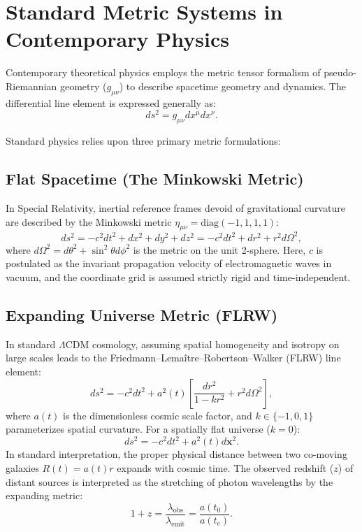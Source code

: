 \section{Standard Metric Systems in Contemporary Physics}
\label{sec:standart_metrik}

Contemporary theoretical physics employs the metric tensor formalism of pseudo-Riemannian geometry ($g_{\mu\nu}$) to describe spacetime geometry and dynamics. The differential line element is expressed generally as:
\begin{equation}
    ds^2 = g_{\mu\nu} dx^\mu dx^\nu.
    \label{eq:genel_cizgi_elemani}
\end{equation}

Standard physics relies upon three primary metric formulations:

\subsection{Flat Spacetime (The Minkowski Metric)}
In Special Relativity, inertial reference frames devoid of gravitational curvature are described by the Minkowski metric $\eta_{\mu\nu} = \mathrm{diag}(-1, 1, 1, 1)$:
\begin{equation}
    ds^2 = -c^2 dt^2 + dx^2 + dy^2 + dz^2 = -c^2 dt^2 + dr^2 + r^2 d\Omega^2,
    \label{eq:minkowski_metrik}
\end{equation}
where $d\Omega^2 = d\theta^2 + \sin^2\theta d\phi^2$ is the metric on the unit 2-sphere. Here, $c$ is postulated as the invariant propagation velocity of electromagnetic waves in vacuum, and the coordinate grid is assumed strictly rigid and time-independent.

\subsection{Expanding Universe Metric (FLRW)}
In standard $\Lambda$CDM cosmology, assuming spatial homogeneity and isotropy on large scales leads to the Friedmann--Lema\^itre--Robertson--Walker (FLRW) line element:
\begin{equation}
    ds^2 = -c^2 dt^2 + a^2(t) \left[ \frac{dr^2}{1 - kr^2} + r^2 d\Omega^2 \right],
    \label{eq:flrw_metrik}
\end{equation}
where $a(t)$ is the dimensionless cosmic scale factor, and $k \in \{-1, 0, 1\}$ parameterizes spatial curvature. For a spatially flat universe ($k=0$):
\begin{equation}
    ds^2 = -c^2 dt^2 + a^2(t) d\mathbf{x}^2.
    \label{eq:flrw_duz}
\end{equation}
In standard interpretation, the proper physical distance between two co-moving galaxies $R(t) = a(t) r$ expands with cosmic time. The observed redshift ($z$) of distant sources is interpreted as the stretching of photon wavelengths by the expanding metric:
\begin{equation}
    1 + z = \frac{\lambda_{\mathrm{obs}}}{\lambda_{\mathrm{emit}}} = \frac{a(t_0)}{a(t_e)}.
    \label{eq:standart_redshift}
\end{equation}

